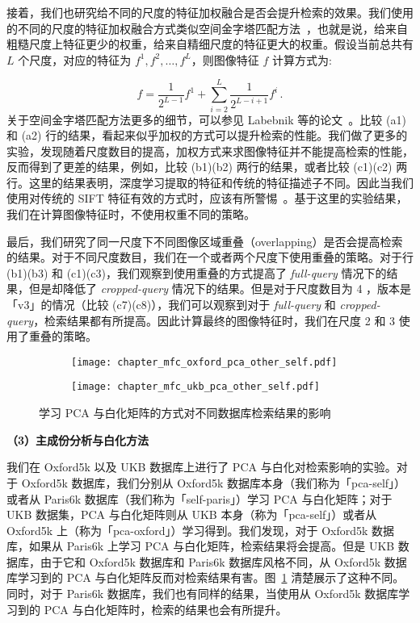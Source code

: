 接着，我们也研究给不同的尺度的特征加权融合是否会提升检索的效果。我们使用的不同的尺度的特征加权融合方式类似空间金字塔匹配方法~\cite{Lazebnik2006BeyondBO}，也就是说，给来自粗糙尺度上特征更少的权重，给来自精细尺度的特征更大的权重。假设当前总共有 $L$ 个尺度，对应的特征为 $f^1, f^2, \ldots, f^L$，则图像特征 $f$ 计算方式为:

\begin{equation}
f = \frac{1}{2^{L-1}}f^1 + \sum_{i=2}^{L}\frac{1}{2^{L-i+1}}f^i\, .
\end{equation}
关于空间金字塔匹配方法更多的细节，可以参见 Labebnik 等的论文~\cite{Lazebnik2006BeyondBO}。比较 (a1) 和 (a2) 行的结果，看起来似乎加权的方式可以提升检索的性能。我们做了更多的实验，发现随着尺度数目的提高，加权方式来求图像特征并不能提高检索的性能，反而得到了更差的结果，例如，比较 (b1)(b2) 两行的结果，或者比较 (c1)(c2) 两行。这里的结果表明，深度学习提取的特征和传统的特征描述子不同。因此当我们使用对传统的 SIFT 特征有效的方式时，应该有所警惕~\cite{Babenko2015AggregatingLD}。基于这里的实验结果，我们在计算图像特征时，不使用权重不同的策略。

最后，我们研究了同一尺度下不同图像区域重叠（overlapping）是否会提高检索的结果。对于不同尺度数目，我们在一个或者两个尺度下使用重叠的策略。对于行 (b1)(b3) 和 (c1)(c3)，我们观察到使用重叠的方式提高了 \emph{full-query} 情况下的结果，但是却降低了 \emph{cropped-query} 情况下的结果。但是对于尺度数目为 4 ，版本是「v3」的情况（比较 (c7)(c8)），我们可以观察到对于 \emph{full-query} 和 \emph{cropped-query}，检索结果都有所提高。因此计算最终的图像特征时，我们在尺度 2 和 3 使用了重叠的策略。


\begin{figure}[!t]
	\centering
	\begin{subfigure}{.5\columnwidth}
		\centering
		\texttt{[image: chapter\_mfc\_oxford\_pca\_other\_self.pdf]}
	\end{subfigure}%
	\hfill
	\begin{subfigure}{.5\columnwidth}
		\centering
		\texttt{[image: chapter\_mfc\_ukb\_pca\_other\_self.pdf]}
	\end{subfigure}
	\caption{学习 PCA 与白化矩阵的方式对不同数据库检索结果的影响}
	\label{fig:pca_self_other_exp}
\end{figure}

\noindent\textbf{（3）主成份分析与白化方法}

我们在 Oxford5k 以及 UKB 数据库上进行了 PCA 与白化对检索影响的实验。对于 Oxford5k 数据库，我们分别从 Oxford5k 数据库本身（我们称为「pca-self」）或者从 Paris6k 数据库（我们称为「self-paris」）学习 PCA 与白化矩阵；对于 UKB 数据集，PCA 与白化矩阵则从 UKB 本身（称为「pca-self」）或者从 Oxford5k 上（称为「pca-oxford」）学习得到。我们发现，对于 Oxford5k 数据库，如果从 Paris6k 上学习 PCA 与白化矩阵，检索结果将会提高。但是 UKB 数据库，由于它和 Oxford5k 数据库和 Paris6k 数据库风格不同，从 Oxford5k 数据库学习到的 PCA 与白化矩阵反而对检索结果有害。图~\ref{fig:pca_self_other_exp} 清楚展示了这种不同。同时，对于 Paris6k 数据库，我们也有同样的结果，当使用从 Oxford5k 数据库学习到的 PCA 与白化矩阵时，检索的结果也会有所提升。

